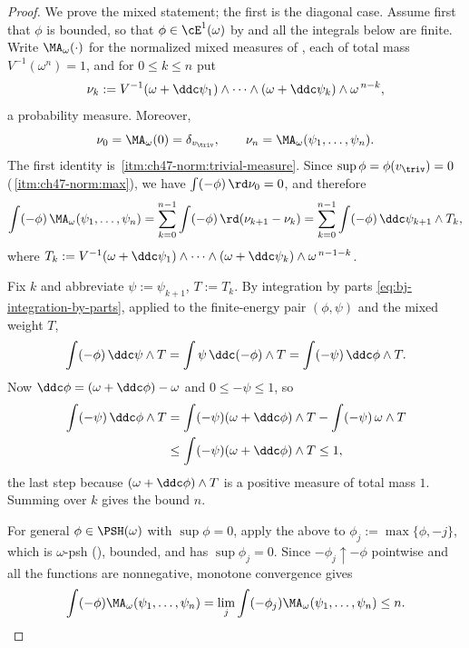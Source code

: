 \begin{proof}
We prove the mixed statement; the first is the diagonal case.  Assume first
that $\phi$ is bounded, so that $\phi\in\cE^1(\omega)$ by
 and all the integrals below are finite.  Write
$\MA_\omega(\cdot)$ for the normalized mixed measures of
, each of total mass $V^{-1}(\omega^n)=1$, and for
$0\le k\le n$ put
\[
 \nu_k:=V^{-1}(\omega+\ddc\psi_1)\wedge\cdots\wedge(\omega+\ddc\psi_k)
        \wedge\omega^{\,n-k},
\]
a probability measure.  Moreover,
\[
 \nu_0=\MA_\omega(0)=\delta_{v_{\triv}},
 \qquad
 \nu_n=\MA_\omega(\psi_1,\dots,\psi_n).
\]
The first identity is
\,\cref{itm:ch47-norm:trivial-measure}.
Since
$\sup\phi=\phi(v_{\triv})=0$
(\,\cref{itm:ch47-norm:max}), we have
$\int(-\phi)\,\rd\nu_0=0$, and therefore
\[
 \int(-\phi)\,\MA_\omega(\psi_1,\dots,\psi_n)
 =\sum_{k=0}^{n-1}\int(-\phi)\,\rd(\nu_{k+1}-\nu_k)
 =\sum_{k=0}^{n-1}\int(-\phi)\,\ddc\psi_{k+1}\wedge T_k ,
\]
where $T_k:=V^{-1}(\omega+\ddc\psi_1)\wedge\cdots\wedge
(\omega+\ddc\psi_k)\wedge\omega^{\,n-1-k}$.

Fix $k$ and abbreviate $\psi:=\psi_{k+1}$, $T:=T_k$.  By integration
by parts \eqref{eq:bj-integration-by-parts}, applied to the finite-energy
pair $(\phi,\psi)$ and the mixed weight $T$,
\[
 \int(-\phi)\,\ddc\psi\wedge T=\int\psi\,\ddc(-\phi)\wedge T
 =\int(-\psi)\,\ddc\phi\wedge T .
\]
Now $\ddc\phi=(\omega+\ddc\phi)-\omega$ and $0\le-\psi\le1$, so
\[
 \begin{aligned}
  \int(-\psi)\,\ddc\phi\wedge T
   &=\int(-\psi)(\omega+\ddc\phi)\wedge T
     -\int(-\psi)\,\omega\wedge T\\
   &\le\int(-\psi)(\omega+\ddc\phi)\wedge T\le1,
 \end{aligned}
\]
the last step because $(\omega+\ddc\phi)\wedge T$ is a positive
measure of total mass $1$.  Summing over $k$ gives the bound $n$.

For general $\phi\in\PSH(\omega)$ with $\sup\phi=0$, apply the above to
$\phi_j:=\max\{\phi,-j\}$, which is $\omega$-psh
(), bounded, and has $\sup\phi_j=0$.  Since
$-\phi_j\uparrow-\phi$ pointwise and all the functions are nonnegative,
monotone convergence gives
\[
 \int(-\phi)\MA_\omega(\psi_1,\dots,\psi_n)
  =\lim_j\int(-\phi_j)\MA_\omega(\psi_1,\dots,\psi_n)\le n.
\]
\end{proof}

